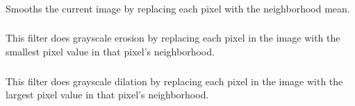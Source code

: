 \subsubsection[\protect\userinterface{Mean\ldots{}}]{\protect{}\label{sub:Mean...}}

Smooths the current image by replacing each pixel with the neighborhood
mean.


\subsubsection[\protect\userinterface{Minimum\ldots{}}]{\protect{}\label{sub:Minimum...}}

This filter does grayscale erosion by replacing each pixel in the
image with the smallest pixel value in that pixel's neighborhood.




\subsubsection[\protect\userinterface{Maximum\ldots{}}]{\protect{}\label{sub:Maximum...}}

This filter does grayscale dilation by replacing each pixel in the
image with the largest pixel value in that pixel's neighborhood.




\subsubsection[\protect\userinterface{Unsharp Mask\ldots{}}]{\protect{}\label{sub:Unsharp-Mask...}}

